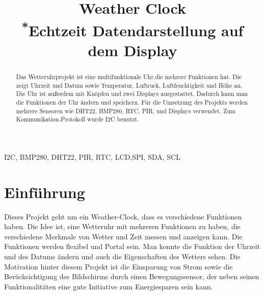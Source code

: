 \documentclass[conference]{IEEEtran}
\begin{document}
\title{Weather Clock\\
{\footnotesize \textsuperscript{*}Echtzeit Datendarstellung auf dem Display}
}

\author{
\and
{}
}

\maketitle

\begin{abstract}
Das Wetteruhrprojekt ist eine multifunktionale Uhr,die  mehrere Funktionen hat. Die zeigt Uhrzeit und Datum sowie Temperatur, Luftruck, Luftfeuchtigkeit und Höhe an. Die Uhr ist außerdem mit Knöpfen und zwei Displays ausgestattet. Dadurch kann man die Funktionen der Uhr ändern und speichern. Für die Umsetzung des Projekts werden mehrere Sensoren wie DHT22, BMP280, RTC, PIR, und Displays verwendet. Zum Kommunikation-Protokoll wurde I2C benutzt.
\end{abstract}

\begin{IEEEkeywords}
I2C, BMP280, DHT22, PIR, RTC, LCD,SPI, SDA, SCL
\end{IEEEkeywords}

\section{Einführung}
Dieses Projekt geht um ein Weather-Clock, dass es verschiedene Funktionen haben. Die Idee ist, eine Wetteruhr mit mehreren Funktionen zu haben, die verschiedene Merkmale von Wetter und Zeit messen und anzeigen kann. Die Funktionen werden flexibel und Portal sein. Man konnte die Funktion der Uhrzeit und des Datums ändern und auch die Eigenschaften des Wetters sehen. Die Motivation hinter diesem Projekt ist die Einsparung von Strom sowie die Berücksichtigung des Bildschirms durch einen Bewegungssensor, der neben seinen Funktionalitäten eine gute Initiative zum Energiesparen sein kann.
   
\end{document}
